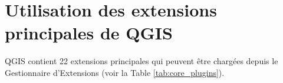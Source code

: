 
\section{Utilisation des extensions principales de QGIS}\label{sec:core_plugins}



QGIS \CURRENT contient 22 extensions principales qui peuvent être chargées depuis
le Gestionnaire d'Extensions (voir la Table \ref{tab:core_plugins}).


